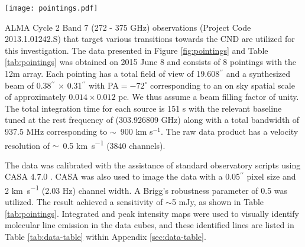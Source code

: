 \documentclass[twocolumn]{aastex631}
\begin{document}
\begin{figure*}
    \centering
    \texttt{[image: pointings.pdf]}
    \caption{The 8 ALMA pointings of size 21$^{\prime\prime}$ at 300 \si{\giga\hertz} that comprise our data, overplotted on an  emission map of Sgr A* and its surrounding Circumnuclear disk (CND). Details of the individual pointings can be found in Table \ref{tab:pointings}. We follow the naming convention in \citet{Christopher2005}, as well as Figure 2 of \citet{sgrANamingConvention}, for referring to regions within and around the CND, e.g. pointing G targets the Northeastern Arm whilst pointings M and L target the Southern Extension. Note: the G pointing is distinct and separate from the dust enshrouded sources of G1 and G2 in \citet{dustEnshroudedSources}.}
    \label{fig:pointings}
\end{figure*}

ALMA Cycle 2 Band 7 (272 - 375 \si{\giga\hertz}) observations (Project Code 2013.1.01242.S) that target various  transitions towards the CND are utilized for this investigation.  The data presented in Figure \ref{fig:pointings} and Table \ref{tab:pointings} was obtained on 2015 June 8 and consists of 8 pointings with the 12m array. Each pointing has a total field of view of 19.608$^{\prime\prime}$ and a synthesized beam of 0.38$^{\prime\prime}$ $\times$ 0.31$^{\prime\prime}$ with PA$=-72^\circ$ corresponding to an on sky spatial scale of approximately $0.014 \times 0.012$ pc. We thus assume a beam filling factor of unity. The total integration time for each source is 151 \si{\second} with the relevant baseline tuned at the rest frequency of  (303.926809 \si{\giga\hertz}) along with a total bandwidth of 937.5 \si{\mega\hertz} corresponding to $\sim$~900 km s$^{-1}$.  The raw data product has a velocity resolution of $\sim$~0.5 \si{\kilo\meter\per\second} (3840 channels).

The data was calibrated with the assistance of standard observatory scripts using CASA 4.7.0 \citep{casa}.  CASA was also used to image the data with a 0.05$^{\prime\prime}$ pixel size and 2 \si{\kilo\meter\per\second} (2.03 Hz) channel width.  A Brigg's robustness parameter of 0.5 was utilized. The result achieved a sensitivity of $\sim$5 mJy, as shown in Table \ref{tab:pointings}.  Integrated and peak intensity maps were used to visually identify molecular line emission in the data cubes, and these identified lines are listed in Table \ref{tab:data-table} within Appendix \ref{sec:data-table}.
\end{document}
